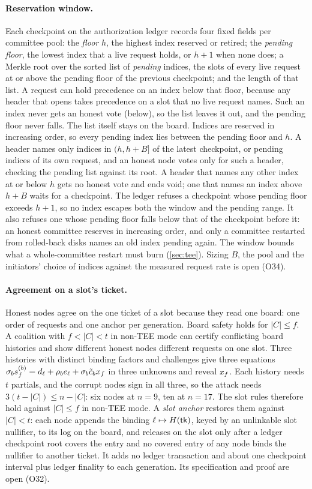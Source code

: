 \paragraph{Reservation window.} Each checkpoint on the authorization ledger records four fixed fields per committee pool: the \emph{floor} $h$, the highest index reserved or retired; the \emph{pending floor}, the lowest index that a live request holds, or $h + 1$ when none does; a Merkle root over the sorted list of \emph{pending} indices, the slots of every live request at or above the pending floor of the previous checkpoint; and the length of that list. A request can hold precedence on an index below that floor, because any header that opens takes precedence on a slot that no live request names. Such an index never gets an honest vote (below), so the list leaves it out, and the pending floor never falls. The list itself stays on the board. Indices are reserved in increasing order, so every pending index lies between the pending floor and $h$. A header names only indices in $(h, h+B]$ of the latest checkpoint, or pending indices of its own request, and an honest node votes only for such a header, checking the pending list against its root. A header that names any other index at or below $h$ gets no honest vote and ends void; one that names an index above $h + B$ waits for a checkpoint. The ledger refuses a checkpoint whose pending floor exceeds $h + 1$, so no index escapes both the window and the pending range. It also refuses one whose pending floor falls below that of the checkpoint before it: an honest committee reserves in increasing order, and only a committee restarted from rolled-back disks names an old index pending again. The window bounds what a whole-committee restart must burn (\cref{sec:tee}). Sizing $B$, the pool and the initiators' choice of indices against the measured request rate is open (O34).

\paragraph{Agreement on a slot's ticket.} Honest nodes agree on the one ticket of a slot because they read one board: one order of requests and one anchor per generation. Board safety holds for $|C| \le f$. A coalition with $f < |C| < t$ in non-TEE mode can certify conflicting board histories and show different honest nodes different requests on one slot. Three histories with distinct binding factors and challenges give three equations $\sigma_b s_f^{(b)} = d_\ell + \rho_b e_\ell + \sigma_b \tilde{c}_b x_{f}$ in three unknowns and reveal $x_{f}$. Each history needs $t$ partials, and the corrupt nodes sign in all three, so the attack needs $3(t - |C|) \le n - |C|$: six nodes at $n = 9$, ten at $n = 17$. The slot rules therefore hold against $|C| \le f$ in non-TEE mode. A \emph{slot anchor} restores them against $|C| < t$: each node appends the binding $\ell \mapsto H(\mathsf{tk})$, keyed by an unlinkable slot nullifier, to its log on the board, and releases on the slot only after a ledger checkpoint root covers the entry and no covered entry of any node binds the nullifier to another ticket. It adds no ledger transaction and about one checkpoint interval plus ledger finality to each generation. Its specification and proof are open (O32).

